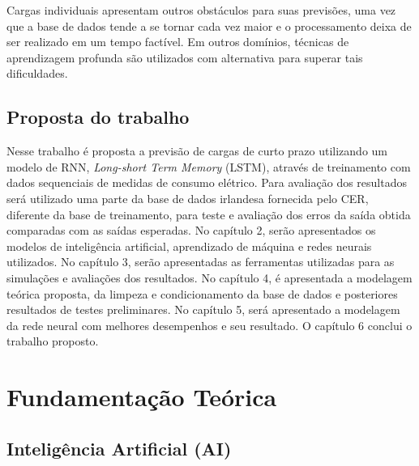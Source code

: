\documentclass[
	12pt,				%
	oneside,			%
	a4paper,			%
	english,			%
	brazil				%
	]{abntex2}
\begin{document}
	Cargas individuais apresentam outros obstáculos para suas previsões, uma vez que a base de dados tende a se tornar cada vez maior e o processamento deixa de ser realizado em  um tempo factível. Em outros domínios, técnicas de aprendizagem profunda são utilizados com alternativa para superar tais dificuldades.

	\section{Proposta do trabalho}
	
	Nesse trabalho é proposta a previsão de cargas de curto prazo utilizando um modelo de RNN, \textit{Long-short Term Memory} (LSTM), através de treinamento com dados sequenciais de medidas de consumo elétrico. Para avaliação dos resultados será utilizado uma parte da base de dados irlandesa fornecida pelo CER, diferente da base de treinamento, para teste e avaliação dos erros da saída obtida comparadas com as saídas esperadas. No capítulo 2, serão apresentados os modelos de inteligência artificial, aprendizado de máquina e redes neurais utilizados. No capítulo 3, serão apresentadas as ferramentas utilizadas para as simulações e avaliações dos resultados. No capítulo 4, é apresentada a modelagem teórica proposta, da limpeza e condicionamento da base de dados e posteriores resultados de testes preliminares. No capítulo 5, será apresentado a modelagem da rede neural com melhores desempenhos e seu resultado. O capítulo 6 conclui o trabalho proposto.
	
\chapter{Fundamentação Teórica}

%	
	\section{Inteligência Artificial (AI)}
\end{document}
